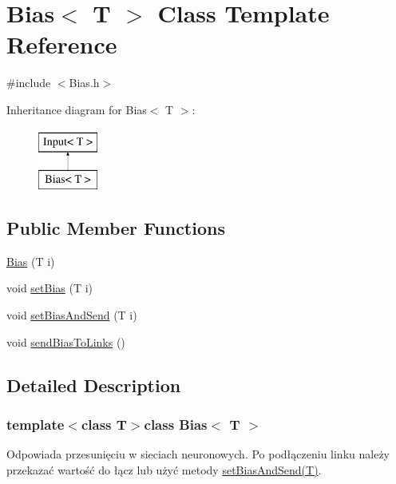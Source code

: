 \hypertarget{class_bias}{\section{\-Bias$<$ \-T $>$ \-Class \-Template \-Reference}
\label{class_bias}
}


{\ttfamily \#include $<$\-Bias.\-h$>$}

\-Inheritance diagram for \-Bias$<$ \-T $>$\-:\begin{figure}[H]
\begin{center}
\leavevmode
\includegraphics[height=2.000000cm]{class_bias}
\end{center}
\end{figure}
\subsection*{\-Public \-Member \-Functions}
\begin{DoxyCompactItemize}
\item 
\hyperlink{class_bias_abb349bc7ef3317db4a7ce75c96dbb533}{\-Bias} (\-T i)
\item 
void \hyperlink{class_bias_ab6df47ae8047f915cfa1fb77683b0eb7}{set\-Bias} (\-T i)
\item 
void \hyperlink{class_bias_a5489ed8d5ecb5bd14e21532968bb3027}{set\-Bias\-And\-Send} (\-T i)
\item 
void \hyperlink{class_bias_a3bf2cdb0a52508399df31b9f7dcf358b}{send\-Bias\-To\-Links} ()
\end{DoxyCompactItemize}


\subsection{\-Detailed \-Description}
\subsubsection*{template$<$class T$>$class Bias$<$ T $>$}

\-Odpowiada przesunięciu w sieciach neuronowych. \-Po podłączeniu linku należy przekazać wartość do łącz lub użyć metody \hyperlink{class_bias_a5489ed8d5ecb5bd14e21532968bb3027}{set\-Bias\-And\-Send(\-T)}. 

